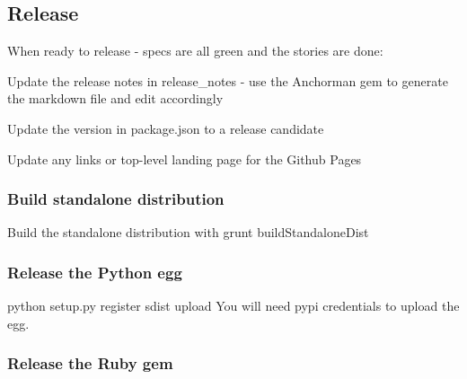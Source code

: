 \subsection*{Release}

When ready to release -\/ specs are all green and the stories are done\+:


\begin{DoxyEnumerate}
\item Update the release notes in {\ttfamily release\+\_\+notes} -\/ use the Anchorman gem to generate the markdown file and edit accordingly
\end{DoxyEnumerate}
\begin{DoxyEnumerate}
\item Update the version in {\ttfamily package.\+json} to a release candidate
\end{DoxyEnumerate}
\begin{DoxyEnumerate}
\item Update any links or top-\/level landing page for the Github Pages
\end{DoxyEnumerate}

\subsubsection*{Build standalone distribution}


\begin{DoxyEnumerate}
\item Build the standalone distribution with {\ttfamily grunt build\+Standalone\+Dist}
\end{DoxyEnumerate}

\subsubsection*{Release the Python egg}


\begin{DoxyEnumerate}
\item {\ttfamily python setup.\+py register sdist upload} You will need pypi credentials to upload the egg.
\end{DoxyEnumerate}

\subsubsection*{Release the Ruby gem}


